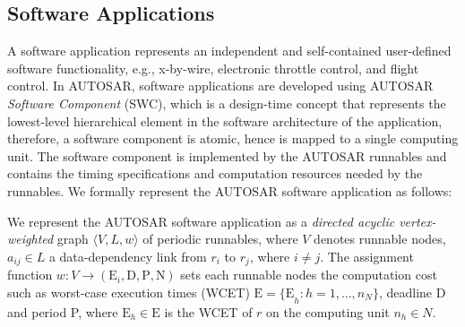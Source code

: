 \subsection{Software Applications}
A software application represents an independent and self-contained user-defined software functionality, e.g., x-by-wire, electronic throttle control, and flight control. In AUTOSAR, software applications are developed using AUTOSAR \textit{Software Component} (SWC), which is a design-time concept that represents the lowest-level hierarchical element in the software architecture of the application, therefore, a software component is atomic, hence is mapped to a single computing unit. The software component is implemented by the AUTOSAR runnables and contains the timing specifications and computation resources needed by the runnables. We formally represent the AUTOSAR software application as follows:
\begin{definition}\label{def_application}We represent the AUTOSAR software application as a \textit{directed acyclic vertex-weighted} graph $\langle V, L, w\rangle$ of periodic runnables, where $V$ denotes runnable nodes, $a_{ij}\in L$ a data-dependency link from $r_i$ to $r_j$, where $i \neq j$. The assignment function $w: V\rightarrow (\mathrm{E}_i\mathrm{,D,P, N})$ sets each runnable nodes the computation cost such as worst-case execution times (WCET) $\mathrm{E=\{E}_h:h=1,...,n_N\}$, deadline D and period P, where $\mathrm{E}_h\in \mathrm{E}$ is the WCET of $r$ on the computing unit $n_h\in N$.
\end{definition}
